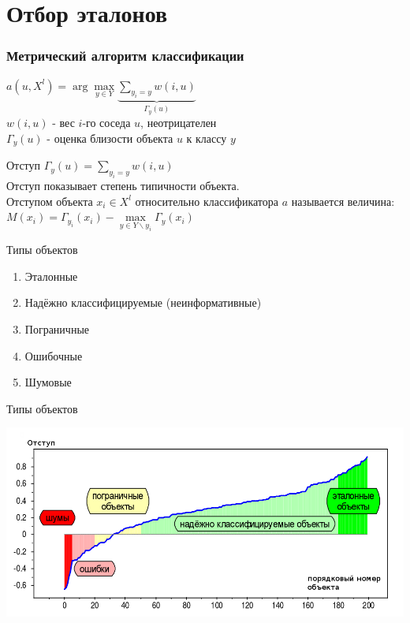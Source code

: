 \documentclass[10pt]{beamer}
\begin{document}
\section{Отбор эталонов}

\begin{frame}\frametitle{Метрический алгоритм классификации}
	${a(u, X^l) = \arg\max\limits_{y \in Y} \underbrace{\sum\limits_{y_i = y} w(i, u)}_{\Gamma_y(u)} }$\\
	\bigbreak
	$w(i, u)$ - вес $i$-го соседа $u$, неотрицателен\\
	$\Gamma_y(u)$ - оценка близости объекта $u$ к классу ${y}$
\end{frame}

\begin{frame}{Отступ}
	${\Gamma_y(u) = \sum\limits_{y_i = y} w(i, u)}$\\
	\bigbreak
	Отступ показывает степень \alert{типичности объекта}.\\
	\bigbreak
	Отступом объекта ${x_i \in X^l}$ относительно классификатора $a$ называется величина:\\
	\bigbreak
	\centering	
  ${M(x_i) = \Gamma_{y_i}(x_i) - \max\limits_{y \in Y\backslash y_i} \Gamma_y(x_i)}$

\end{frame}

\begin{frame}{Типы объектов}
	\begin{enumerate}
		\item Эталонные
		\item Надёжно классифицируемые (неинформативные)
		\item Пограничные	
		\item Ошибочные	
		\item Шумовые	
	\end{enumerate}
\end{frame}

{
\begin{frame}{Типы объектов}
  \begin{center}
    \includegraphics[width=\textwidth, keepaspectratio]{images/margin}
  \end{center}
\end{frame}
}
\end{document}

